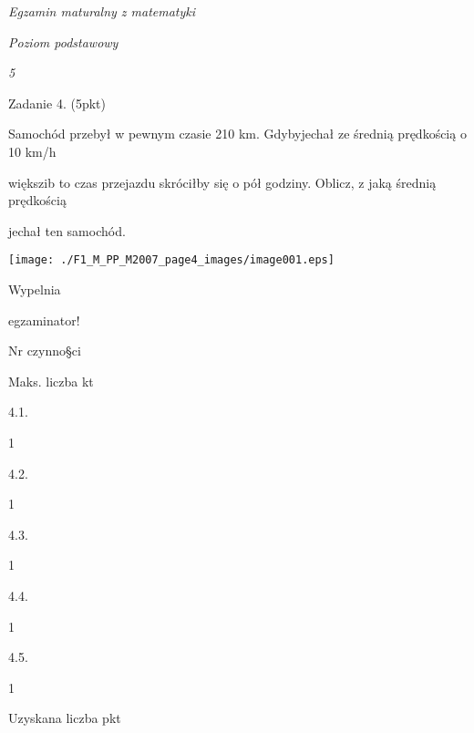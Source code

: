 \documentclass[a4paper,12pt]{article}
\begin{document}
{\it Egzamin maturalny z matematyki}

{\it Poziom podstawowy}

{\it 5}

Zadanie 4. (5pkt)

Samochód przebył w pewnym czasie 210 km. Gdybyjechał ze średnią prędkością o 10 km/h

większib to czas przejazdu skróciłby się o pół godziny. Oblicz, z jaką średnią prędkością

jechał ten samochód.
\begin{center}
\texttt{[image: ./F1\_M\_PP\_M2007\_page4\_images/image001.eps]}
\end{center}
Wypelnia

egzaminator!

Nr czynno\S ci

Maks. liczba kt

4.1.

1

4.2.

1

4.3.

1

4.4.

1

4.5.

1

Uzyskana liczba pkt
\end{document}

